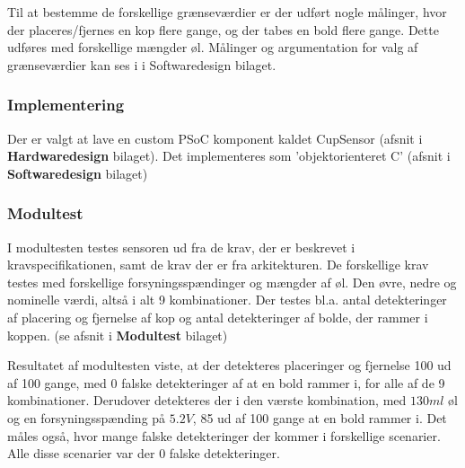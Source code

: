 \documentclass[Rapport/Rapport_main.tex]{subfiles}
\begin{document}
Til at bestemme de forskellige grænseværdier er der udført nogle målinger, hvor der placeres/fjernes en kop flere gange, og der tabes en bold flere gange. Dette udføres med forskellige mængder øl. Målinger og argumentation for valg af grænseværdier kan ses i  i Softwaredesign bilaget. 

 

\subsubsection{Implementering}\label{sec:CupSensorImplementering}
Der er valgt at lave en custom PSoC komponent kaldet CupSensor (afsnit  i \textbf{Hardwaredesign} bilaget). Det implementeres som 'objektorienteret C' (afsnit  i \textbf{Softwaredesign} bilaget)

\subsubsection{Modultest}
I modultesten testes sensoren ud fra de krav, der er beskrevet i kravspecifikationen, samt de krav der er fra arkitekturen. De forskellige krav testes med forskellige forsyningsspændinger og mængder af øl. Den øvre, nedre og nominelle værdi, altså i alt 9 kombinationer. Der testes bl.a. antal detekteringer af placering og fjernelse af kop og antal detekteringer af bolde, der rammer i koppen. (se afsnit  i \textbf{Modultest} bilaget)

Resultatet af modultesten viste, at der detekteres placeringer og fjernelse 100 ud af 100 gange, med 0 falske detekteringer af at en bold rammer i, for alle af de 9 kombinationer. Derudover detekteres der i den værste kombination, med $130\si{ml}$ øl og en forsyningsspænding på $5.2\si{V}$, 85 ud af 100 gange at en bold rammer i. Det måles også, hvor mange falske detekteringer der kommer i forskellige scenarier. Alle disse scenarier var der 0 falske detekteringer.
\end{document}
